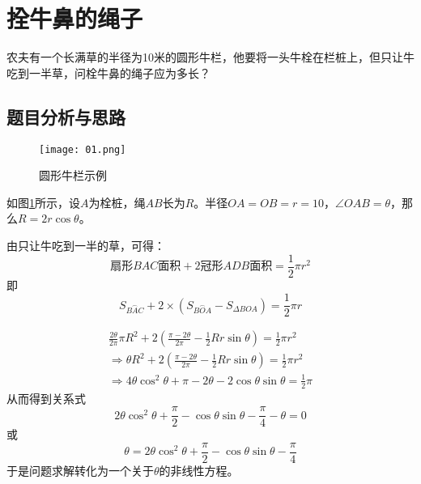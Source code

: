 \documentclass{math201}
\date{\today}
\begin{document}

\makecover


\section{拴牛鼻的绳子}
农夫有一个长满草的半径为10米的圆形牛栏，他要将一头牛栓在栏桩上，但只让牛吃到一半草，问栓牛鼻的绳子应为多长？

\subsection{题目分析与思路}

\begin{figure}[H]  
    \centering\texttt{[image: 01.png]}  
    \caption{圆形牛栏示例}     
    \label{img01}   
\end{figure}
    
如图\ref*{img01}所示，设$A$为栓桩，绳$AB$长为$R$。半径$OA=OB=r=10$，$\angle OAB=\theta$，那么$R=2r\cos\theta$。

由只让牛吃到一半的草，可得：
\begin{equation}
    \mbox{扇形}BAC\mbox{面积} + 2\mbox{冠形}ADB\mbox{面积} = \frac{1}{2}\pi r^2
\end{equation}
即
\begin{equation}
    S_{\overset{\frown}{BAC}} + 2\times(S_{\overset{\frown}{BOA}} - S_{\Delta BOA}) = \frac{1}{2}\pi r
    \nonumber
\end{equation}

\begin{equation}
    \begin{split}
        \frac{2\theta}{2\pi}\pi R^2 + 2(\frac{\pi - 2\theta}{2\pi} - \frac{1}{2}Rr\sin\theta) = \frac{1}{2}\pi r^2 \\
        \Rightarrow \theta R^2 + 2(\frac{\pi - 2\theta}{2\pi} - \frac{1}{2}Rr\sin\theta) = \frac{1}{2}\pi r^2 \\
        \Rightarrow 4\theta\cos^2\theta + \pi - 2\theta - 2\cos\theta\sin\theta = \frac{1}{2}\pi
    \end{split}
    \nonumber
\end{equation}
从而得到关系式
\begin{equation}
    2\theta\cos^2\theta + \frac{\pi}{2} - \cos\theta\sin\theta - \frac{\pi}{4} - \theta = 0 \label{equation:1}
\end{equation}
或
\begin{equation}
    \theta = 2\theta\cos^2\theta + \frac{\pi}{2} - \cos\theta\sin\theta - \frac{\pi}{4}
\end{equation}
于是问题求解转化为一个关于$\theta$的非线性方程。
\end{document}
